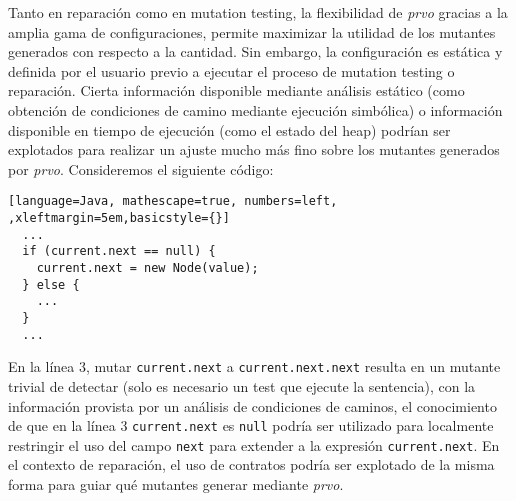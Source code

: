 Tanto en reparaci\'on como en mutation testing, la flexibilidad de \emph{prvo} gracias a la amplia gama de configuraciones, permite maximizar la utilidad de los mutantes generados con respecto a la cantidad. Sin embargo, la configuraci\'on es est\'atica y definida por el usuario previo a ejecutar el proceso de mutation testing o reparaci\'on. Cierta informaci\'on disponible mediante an\'alisis est\'atico (como obtenci\'on de condiciones de camino mediante ejecuci\'on simb\'olica) o informaci\'on disponible en tiempo de ejecuci\'on (como el estado del heap) podr\'ian ser explotados para realizar un ajuste mucho m\'as fino sobre los mutantes generados por \emph{prvo}. Consideremos el siguiente c\'odigo:
\begin{lstlisting}[language=Java, mathescape=true, numbers=left, ,xleftmargin=5em,basicstyle={}]
  ...
  if (current.next == null) {
    current.next = new Node(value);
  } else {
    ...
  }
  ...
\end{lstlisting}
En la l\'inea $3$, mutar \texttt{current.next} a \texttt{current.next.next} resulta en un mutante trivial de detectar (solo es necesario un test que ejecute la sentencia), con la informaci\'on provista por un an\'alisis de condiciones de caminos, el conocimiento de que en la l\'inea $3$ \texttt{current.next} es \texttt{null} podr\'ia ser utilizado para localmente restringir el uso del campo \texttt{next} para extender a la expresi\'on \texttt{current.next}.
En el contexto de reparaci\'on, el uso de contratos podr\'ia ser explotado de la misma forma para guiar qu\'e mutantes generar mediante \emph{prvo}.